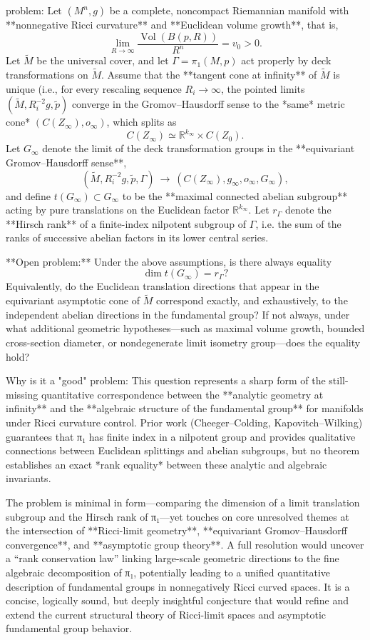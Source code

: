 problem:  
Let \((M^n,g)\) be a complete, noncompact Riemannian manifold with **nonnegative Ricci curvature** and **Euclidean volume growth**, that is,  
\[
\lim_{R\to \infty}\frac{\operatorname{Vol}(B(p,R))}{R^n}=v_0>0.
\]  
Let \(\widetilde M\) be the universal cover, and let \(\Gamma=\pi_1(M,p)\) act properly by deck transformations on \(\widetilde M\).  
Assume that the **tangent cone at infinity** of \(\widetilde M\) is unique (i.e., for every rescaling sequence \(R_i\to\infty\), the pointed limits \((\widetilde M,R_i^{-2}g,\tilde p)\) converge in the Gromov–Hausdorff sense to the *same* metric cone* \((C(Z_\infty), o_\infty)\), which splits as  
\[
C(Z_\infty) \simeq \mathbb{R}^{k_\infty}\times C(Z_0).
\]  
Let \(G_\infty\) denote the limit of the deck transformation groups in the **equivariant Gromov–Hausdorff sense**,  
\[
(\widetilde M,R_i^{-2}g,\tilde p,\Gamma)\ \longrightarrow\ (C(Z_\infty),g_\infty,o_\infty,G_\infty),
\]  
and define \(t(G_\infty)\subset G_\infty\) to be the **maximal connected abelian subgroup** acting by pure translations on the Euclidean factor \(\mathbb{R}^{k_\infty}\).  
Let \(r_\Gamma\) denote the **Hirsch rank** of a finite-index nilpotent subgroup of \(\Gamma\), i.e. the sum of the ranks of successive abelian factors in its lower central series.

**Open problem:**  
Under the above assumptions, is there always equality
\[
\dim t(G_\infty) = r_\Gamma ?
\]
Equivalently, do the Euclidean translation directions that appear in the equivariant asymptotic cone of \(\widetilde M\) correspond exactly, and exhaustively, to the independent abelian directions in the fundamental group?  
If not always, under what additional geometric hypotheses—such as maximal volume growth, bounded cross-section diameter, or nondegenerate limit isometry group—does the equality hold?

Why is it a "good" problem:  
This question represents a sharp form of the still-missing quantitative correspondence between the **analytic geometry at infinity** and the **algebraic structure of the fundamental group** for manifolds under Ricci curvature control.  
Prior work (Cheeger–Colding, Kapovitch–Wilking) guarantees that π₁ has finite index in a nilpotent group and provides qualitative connections between Euclidean splittings and abelian subgroups, but no theorem establishes an exact *rank equality* between these analytic and algebraic invariants.  

The problem is minimal in form—comparing the dimension of a limit translation subgroup and the Hirsch rank of π₁—yet touches on core unresolved themes at the intersection of **Ricci-limit geometry**, **equivariant Gromov–Hausdorff convergence**, and **asymptotic group theory**.  
A full resolution would uncover a “rank conservation law” linking large-scale geometric directions to the fine algebraic decomposition of π₁, potentially leading to a unified quantitative description of fundamental groups in nonnegatively Ricci curved spaces.  
It is a concise, logically sound, but deeply insightful conjecture that would refine and extend the current structural theory of Ricci-limit spaces and asymptotic fundamental group behavior.
